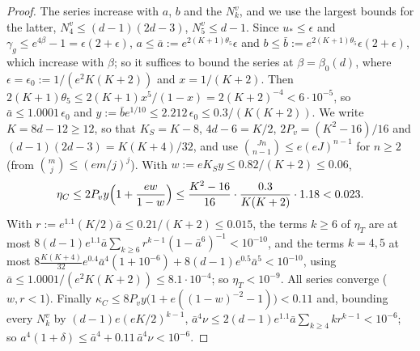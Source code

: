 \documentclass[11pt,a4paper]{article}
\theoremstyle{definition}
\theoremstyle{remark}
\begin{document}
\begin{proof}
The series increase with $a$, $b$ and the $N^v_k$, and we use the largest bounds for the latter, $N^v_4\le(d-1)(2d-3)$, $N^v_5\le d-1$. Since $u_*\le\epsilon$
and $\gamma_g\le e^{4\beta}-1=\epsilon(2+\epsilon)$, $a\le\bar a:=e^{2(K+1)\theta_5}\epsilon$ and $b\le\bar b:=e^{2(K+1)\theta_5}\epsilon(2+\epsilon)$, which increase with
$\beta$; so it suffices to bound the series at $\beta=\beta_0(d)$, where $\epsilon=\epsilon_0:=1/(e^2K(K+2))$ and $x=1/(K+2)$. Then
$2(K+1)\theta_5\le2(K+1)x^5/(1-x)=2(K+2)^{-4}<6\cdot10^{-5}$, so $\bar a\le1.0001\,\epsilon_0$ and $y:=\bar be^{1/10}\le2.212\,\epsilon_0\le0.3/(K(K+2))$. We write
$K=8d-12\ge12$, so that $K_S=K-8$, $4d-6=K/2$, $2P_v=(K^2-16)/16$ and $(d-1)(2d-3)=K(K+4)/32$, and use $\binom{Jn}{n-1}\le e(eJ)^{n-1}$ for $n\ge2$
(from $\binom mj\le(em/j)^j$). With $w:=eK_Sy\le0.82/(K+2)\le0.06$,
\[
\eta_C\le2P_vy\Bigl(1+\frac{ew}{1-w}\Bigr)\le\frac{K^2-16}{16}\cdot\frac{0.3}{K(K+2)}\cdot1.18<0.023 .
\]
With $r:=e^{1.1}(K/2)\bar a\le0.21/(K+2)\le0.015$, the terms $k\ge6$ of $\eta_T$ are at most $8(d-1)e^{1.1}\bar a\sum_{k\ge6}r^{k-1}(1-\bar a^6)^{-1}<10^{-10}$, and the terms
$k=4,5$ at most $8\frac{K(K+4)}{32}e^{0.4}\bar a^4(1+10^{-6})+8(d-1)e^{0.5}\bar a^5<10^{-10}$, using $\bar a\le1.0001/(e^2K(K+2))\le8.1\cdot10^{-4}$; so
$\eta_T<10^{-9}$. All series converge ($w,r<1$). Finally $\kappa_C\le8P_vy\bigl(1+e((1-w)^{-2}-1)\bigr)<0.11$ and, bounding every $N^v_k$ by
$(d-1)e(eK/2)^{k-1}$, $\bar a^4\nu\le2(d-1)e^{1.1}\bar a\sum_{k\ge4}kr^{k-1}<10^{-6}$; so $a^4(1+\delta)\le\bar a^4+0.11\,\bar a^4\nu<10^{-6}$.
\end{proof}
\end{document}
